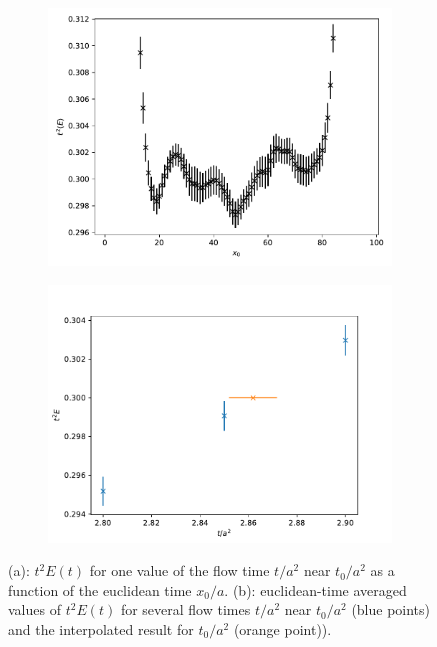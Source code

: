 \begin{figure}
    \begin{subfigure}{1.\textwidth}
    	\includegraphics[width=\textwidth]{./cap3/figs/t2E_vs_x0.pdf}
    	\caption{}
    \end{subfigure}
    \begin{subfigure}{1.\textwidth}
    	\includegraphics[width=\textwidth]{./cap3/figs/t2E_vs_t.pdf}
    	\caption{}
    \end{subfigure}
    \caption{(a): $t^2E(t)$ for one value of the flow time $t/a^2$ near $t_0/a^2$ as a function of the euclidean time $x_0/a$. (b): euclidean-time averaged values of $t^2E(t)$ for several flow times $t/a^2$ near $t_0/a^2$ (blue points) and the interpolated result for $t_0/a^2$ (orange point)).}
        \label{ch_observables:fig:t2E}
\end{figure}


